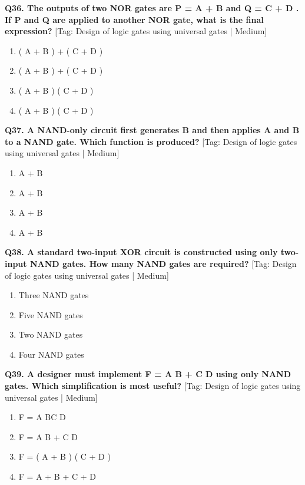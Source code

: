 \noindent\textbf{Q36. The outputs of two NOR gates are P = A + B and Q = C + D . If P and Q are applied to another NOR gate, what is the final expression?} \hfill [Tag: Design of logic gates using universal gates | Medium]
\begin{enumerate}[label=(\alph*),topsep=2pt,itemsep=1pt,partopsep=0pt,parsep=0pt]
    \item {( A + B ) + ( C + D )}
    \item {( A + B ) + ( C + D )}
    \item {( A + B ) ( C + D )}
    \item {( A + B ) ( C + D )}
\end{enumerate}
\vspace{2mm}

\noindent\textbf{Q37. A NAND-only circuit first generates B and then applies A and B to a NAND gate. Which function is produced?} \hfill [Tag: Design of logic gates using universal gates | Medium]
\begin{enumerate}[label=(\alph*),topsep=2pt,itemsep=1pt,partopsep=0pt,parsep=0pt]
    \item {A + B}
    \item {A + B}
    \item {A + B}
    \item {A + B}
\end{enumerate}
\vspace{2mm}

\noindent\textbf{Q38. A standard two-input XOR circuit is constructed using only two-input NAND gates. How many NAND gates are required?} \hfill [Tag: Design of logic gates using universal gates | Medium]
\begin{enumerate}[label=(\alph*),topsep=2pt,itemsep=1pt,partopsep=0pt,parsep=0pt]
    \item {Three NAND gates}
    \item {Five NAND gates}
    \item {Two NAND gates}
    \item {Four NAND gates}
\end{enumerate}
\vspace{2mm}

\noindent\textbf{Q39. A designer must implement F = A B + C D using only NAND gates. Which simplification is most useful?} \hfill [Tag: Design of logic gates using universal gates | Medium]
\begin{enumerate}[label=(\alph*),topsep=2pt,itemsep=1pt,partopsep=0pt,parsep=0pt]
    \item {F = A BC D}
    \item {F = A B + C D}
    \item {F = ( A + B ) ( C + D )}
    \item {F = A + B + C + D}
\end{enumerate}
\vspace{2mm}

